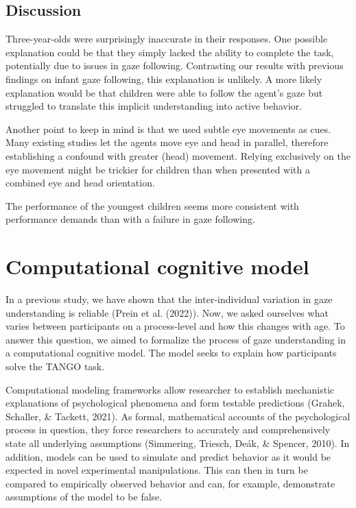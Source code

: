 \documentclass[
  man,floatsintext]{apa6}
\begin{document}
\hypertarget{discussion}{%
\subsection{Discussion}\label{discussion}}

Three-year-olds were surprisingly inaccurate in their responses.
One possible explanation could be that they simply lacked the ability to complete the task, potentially due to issues in gaze following.
Contrasting our results with previous findings on infant gaze following, this explanation is unlikely.
A more likely explanation would be that children were able to follow the agent's gaze but struggled to translate this implicit understanding into active behavior.

Another point to keep in mind is that we used subtle eye movements as cues.
Many existing studies let the agents move eye and head in parallel, therefore establishing a confound with greater (head) movement.
Relying exclusively on the eye movement might be trickier for children than when presented with a combined eye and head orientation.

The performance of the youngest children seems more consistent with performance demands than with a failure in gaze following.

\hypertarget{computational-cognitive-model}{%
\section{Computational cognitive model}\label{computational-cognitive-model}}

In a previous study, we have shown that the inter-individual variation in gaze understanding is reliable (Prein et al. (2022)).
Now, we asked ourselves what varies between participants on a process-level and how this changes with age.
To answer this question, we aimed to formalize the process of gaze understanding in a computational cognitive model.
The model seeks to explain how participants solve the TANGO task.

Computational modeling frameworks allow researcher to establish mechanistic explanations of psychological phenomena and form testable predictions (Grahek, Schaller, \& Tackett, 2021).
As formal, mathematical accounts of the psychological process in question, they force researchers to accurately and comprehensively state all underlying assumptions (Simmering, Triesch, Deák, \& Spencer, 2010).
In addition, models can be used to simulate and predict behavior as it would be expected in novel experimental manipulations.
This can then in turn be compared to empirically observed behavior and can, for example, demonstrate assumptions of the model to be false.
\end{document}
